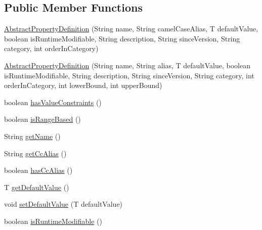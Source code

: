 \subsection*{Public Member Functions}
\begin{DoxyCompactItemize}
\item 
\mbox{\hyperlink{classcom_1_1mysql_1_1cj_1_1conf_1_1_abstract_property_definition_af8621793d8a8f9b8650e1499459fd543}{Abstract\+Property\+Definition}} (String name, String camel\+Case\+Alias, T default\+Value, boolean is\+Runtime\+Modifiable, String description, String since\+Version, String category, int order\+In\+Category)
\item 
\mbox{\hyperlink{classcom_1_1mysql_1_1cj_1_1conf_1_1_abstract_property_definition_a7b63ae375eaec02cfcf511af7cc3876c}{Abstract\+Property\+Definition}} (String name, String alias, T default\+Value, boolean is\+Runtime\+Modifiable, String description, String since\+Version, String category, int order\+In\+Category, int lower\+Bound, int upper\+Bound)
\item 
boolean \mbox{\hyperlink{classcom_1_1mysql_1_1cj_1_1conf_1_1_abstract_property_definition_a2a34114907269a32b04a433c42982355}{has\+Value\+Constraints}} ()
\item 
boolean \mbox{\hyperlink{classcom_1_1mysql_1_1cj_1_1conf_1_1_abstract_property_definition_a9395e63d016a2cf36bd19860dc160a29}{is\+Range\+Based}} ()
\item 
String \mbox{\hyperlink{classcom_1_1mysql_1_1cj_1_1conf_1_1_abstract_property_definition_a7b5a7c72c029a0d0b25658f61f2bca01}{get\+Name}} ()
\item 
String \mbox{\hyperlink{classcom_1_1mysql_1_1cj_1_1conf_1_1_abstract_property_definition_af42f8fd9bb3feef2843558105b4246a1}{get\+Cc\+Alias}} ()
\item 
boolean \mbox{\hyperlink{classcom_1_1mysql_1_1cj_1_1conf_1_1_abstract_property_definition_a5c08adb553273bffe89b193a112c21d3}{has\+Cc\+Alias}} ()
\item 
T \mbox{\hyperlink{classcom_1_1mysql_1_1cj_1_1conf_1_1_abstract_property_definition_a3ed1c7b670a446214f7e08b450c8688c}{get\+Default\+Value}} ()
\item 
void \mbox{\hyperlink{classcom_1_1mysql_1_1cj_1_1conf_1_1_abstract_property_definition_aa91b691f396f34df18bb41178b9c23df}{set\+Default\+Value}} (T default\+Value)
\item 
boolean \mbox{\hyperlink{classcom_1_1mysql_1_1cj_1_1conf_1_1_abstract_property_definition_a6c98140b2db84ccd0ff29ce165ec9ef5}{is\+Runtime\+Modifiable}} ()

\end{DoxyCompactItemize}
